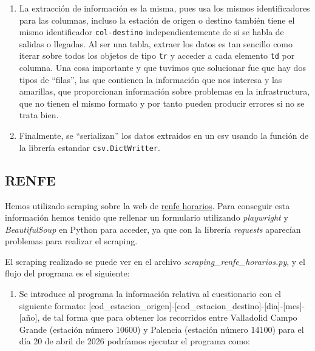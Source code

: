 \begin{enumerate}
\def\labelenumi{\arabic{enumi}.}
\setcounter{enumi}{2}
\tightlist
\item
  La extracción de información es la misma, pues usa los mismos
  identificadores para las columnas, incluso la estación de origen o
  destino también tiene el mismo identificador \texttt{col-destino}
  independientemente de si se habla de salidas o llegadas. Al ser una
  tabla, extraer los datos es tan sencillo como iterar sobre todos los
  objetos de tipo \texttt{tr} y acceder a cada elemento \texttt{td} por
  columna. Una cosa importante y que tuvimos que solucionar fue que hay
  dos tipos de ``filas'', las que contienen la información que nos
  interesa y las amarillas, que proporcionan información sobre problemas
  en la infrastructura, que no tienen el mismo formato y por tanto
  pueden producir errores si no se trata bien.
\item
  Finalmente, se ``serializan'' los datos extraidos en un csv usando la
  función de la librería estandar \texttt{csv.DictWritter}.
\end{enumerate}

\subsection{RENFE}\label{renfe}

Hemos utilizado scraping sobre la web de
\href{https://www.renfe.com/es/es/viajar/informacion-util/horarios}{renfe
horarios}. Para conseguir esta información hemos tenido que rellenar un
formulario utilizando \emph{playwright} y \emph{BeautifulSoup} en Python
para acceder, ya que con la librería \emph{requests} aparecían problemas
para realizar el scraping.

El scraping realizado se puede ver en el archivo
\emph{scraping\_renfe\_horarios.py}, y el flujo del programa es el
siguiente:

\begin{enumerate}
\def\labelenumi{\arabic{enumi}.}
\tightlist
\item
  Se introduce al programa la información relativa al cuestionario con
  el siguiente formato:
  {[}cod\_estacion\_origen{]}-{[}cod\_estacion\_destino{]}-{[}dia{]}-{[}mes{]}-{[}año{]},
  de tal forma que para obtener los recorridos entre Valladolid Campo
  Grande (estación número 10600) y Palencia (estación número 14100) para
  el día 20 de abril de 2026 podríamos ejecutar el programa como:
\end{enumerate}

